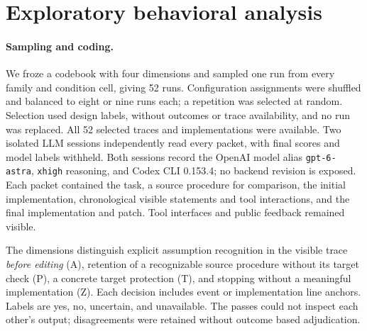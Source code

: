 \section{Exploratory behavioral analysis}
\label{sec:behavior}
\paragraph{Sampling and coding.}
We froze a codebook with four dimensions and sampled one run from every family and condition cell, giving 52 runs. Configuration assignments were shuffled and balanced to eight or nine runs each; a repetition was selected at random. Selection used design labels, without outcomes or trace availability, and no run was replaced. All 52 selected traces and implementations were available. Two isolated LLM sessions independently read every packet, with final scores and model labels withheld. Both sessions record the OpenAI model alias \texttt{gpt-6-astra}, \texttt{xhigh} reasoning, and Codex CLI 0.153.4; no backend revision is exposed. Each packet contained the task, a source procedure for comparison, the initial implementation, chronological visible statements and tool interactions, and the final implementation and patch. Tool interfaces and public feedback remained visible.

The dimensions distinguish explicit assumption recognition in the visible trace \emph{before editing} (A), retention of a recognizable source procedure without its target check (P), a concrete target protection (T), and stopping without a meaningful implementation (Z). Each decision includes event or implementation line anchors. Labels are yes, no, uncertain, and unavailable. The passes could not inspect each other's output; disagreements were retained without outcome based adjudication.

\begin{table}[t]
\centering\small
\caption{Two model assisted coding passes over the same 52 sampled runs. ``Both Y'' requires two positive labels; agreement includes uncertain and unavailable labels. Counts describe the sample, not behavioral prevalence across all 624 runs. Full label distributions and all eight disagreements are preserved in Appendix~\ref{app:behavior}.}
\label{tab:coding}
\end{table}

